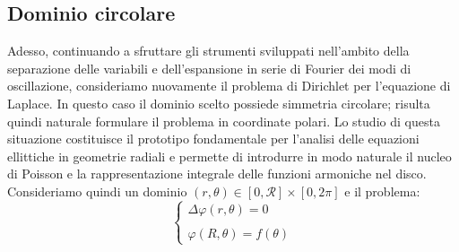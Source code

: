 \documentclass[a4paper,12pt]{report}
\begin{document}
\newpage

\subsection{Dominio circolare}\label{sec: 4.3.2}

Adesso, continuando a sfruttare gli strumenti sviluppati nell’ambito della separazione delle variabili e dell’espansione in serie di Fourier dei modi di oscillazione, consideriamo nuovamente il problema di Dirichlet per l’equazione di Laplace. In questo caso il dominio scelto possiede simmetria circolare; risulta quindi naturale formulare il problema in coordinate polari. Lo studio di questa situazione costituisce il prototipo fondamentale per l’analisi delle equazioni ellittiche in geometrie radiali e permette di introdurre in modo naturale il nucleo di Poisson e la rappresentazione integrale delle funzioni armoniche nel disco. Consideriamo quindi un dominio $(r,\theta)\in[0,\mathcal{R}]\times[0,2\pi]$ e il problema:
\[\begin{cases}
    \Delta\varphi(r,\theta)=0
    \\
    \\\varphi(R,\theta)=f(\theta)
\end{cases}\]
\end{document}
